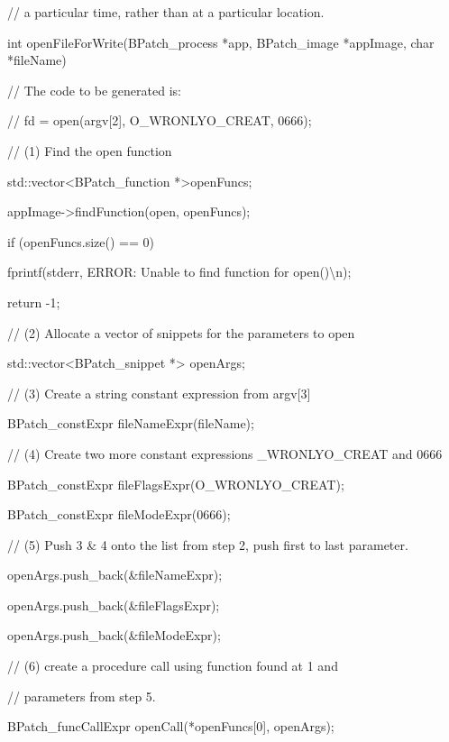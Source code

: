 {{{{{{{{
// a particular time, rather than at a particular location.}


\bigskip

{
int openFileForWrite(BPatch_process *app, BPatch_image *appImage, char *fileName) {}

{
// The code to be generated is:

{
// fd = open(argv[2], O_WRONLY{\textbar}O_CREAT, 0666);


\bigskip

{
// (1) Find the open function

{
std::vector<BPatch_function *>openFuncs;

{
appImage->findFunction({\textquotedbl}open{\textquotedbl}, openFuncs);

{
if (openFuncs.size() == 0) {}

{
fprintf(stderr, {\textquotedbl}ERROR: Unable to find function for
open(){\textbackslash}n{\textquotedbl});}

{
return -1;}

{
}}


\bigskip

{
// (2) Allocate a vector of snippets for the parameters to open

{
std::vector<BPatch_snippet *> openArgs;


\bigskip

{
// (3) Create a string constant expression from argv[3]

{
BPatch_constExpr fileNameExpr(fileName);


\bigskip

{
// (4) Create two more constant expressions _WRONLY{\textbar}O_CREAT and 0666

{
BPatch_constExpr fileFlagsExpr(O_WRONLY{\textbar}O_CREAT);

{
BPatch_constExpr fileModeExpr(0666);


\bigskip

{
// (5) Push 3 & 4 onto the list from step 2, push first to last parameter.}

{
openArgs.push_back(&fileNameExpr);

{
openArgs.push_back(&fileFlagsExpr);

{
openArgs.push_back(&fileModeExpr);


\bigskip

{
// (6) create a procedure call using function found at 1 and

{
// parameters from step 5.

{
BPatch_funcCallExpr openCall(*openFuncs[0], openArgs);


}}}}}}}}}}}}}}}}}}}}}}}}}}
